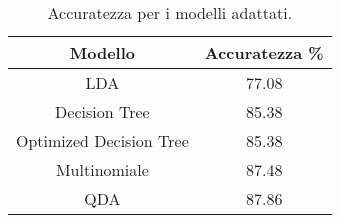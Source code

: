 \begin{table}[H]
\centering
\caption{Accuratezza per i modelli adattati.}
\begin{tabular}{cc}
\toprule
                 Modello &  Accuratezza \% \\
\midrule
                     LDA &          77.08 \\
           Decision Tree &          85.38 \\
 Optimized Decision Tree &          85.38 \\
            Multinomiale &          87.48 \\
                     QDA &          87.86 \\
\bottomrule
\end{tabular}
\label{tab:acc}
\end{table}